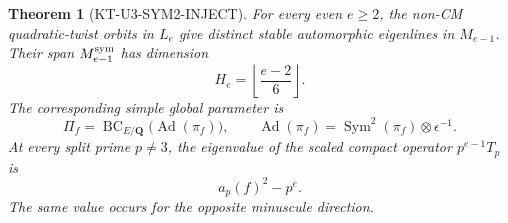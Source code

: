 \documentclass[11pt,a4paper]{article}
\newtheorem{theorem}{Theorem}[section]
\theoremstyle{definition}
\begin{document}
\begin{theorem}[KT-U3-SYM2-INJECT]
For every even $e\geq2$, the non-CM quadratic-twist orbits
in $L_e$ give distinct stable automorphic eigenlines in
$M_{e-1}$.  Their span $M_{e-1}^{\rm sym}$ has dimension
\[
                 H_e=\left\lfloor\frac{e-2}{6}\right\rfloor.
                                                               \tag{KT-S.2}
\]
The corresponding simple global parameter is
\[
 \Pi_f=\operatorname{BC}_{E/\mathbf Q}
             \bigl(\operatorname{Ad}(\pi_f)\bigr),
 \qquad
 \operatorname{Ad}(\pi_f)
       =\operatorname{Sym}^2(\pi_f)\otimes\epsilon^{-1}.
                                                               \tag{KT-S.3}
\]
At every split prime $p\ne3$, the eigenvalue of the scaled
compact operator $p^{e-1}T_p$ is
\[
                   a_p(f)^2-p^e.                              \tag{KT-S.4}
\]
The same value occurs for the opposite minuscule direction.
\end{theorem}
\end{document}
